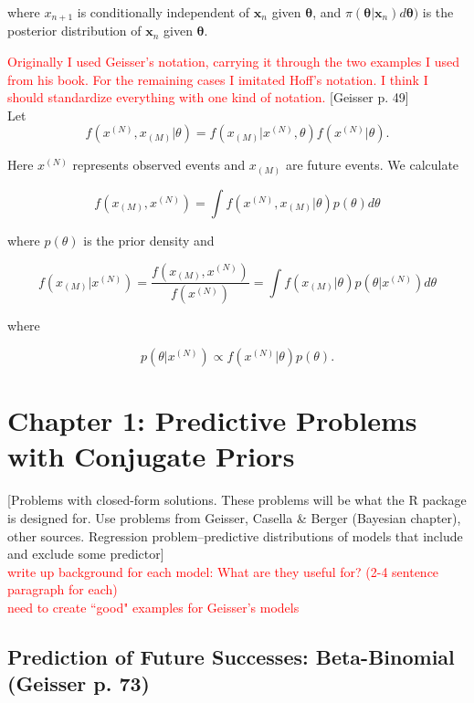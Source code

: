 \documentclass[12pt, a4paper]{article}
\begin{document}
\noindent where $x_{n+1}$ is conditionally independent of $\mathbf{x}_n$ given $\boldsymbol\theta$, and $\pi(\boldsymbol\theta | \mathbf{x}_n)d\boldsymbol\theta)$ is the posterior distribution of $\mathbf{x}_n$ given $\boldsymbol\theta$.

\textcolor{red}{Originally I used Geisser's notation, carrying it through the two examples I used from his book.  For the remaining cases I imitated Hoff's notation.  I think I should standardize everything with one kind of notation.}
    [Geisser p. 49]\\

        Let $$f\left(x^{(N)},x_{(M)}|\theta\right) = f\left(x_{(M)}|x^{(N)},\theta\right)f\left(x^{(N)}|\theta\right).$$

    Here $x^{(N)}$ represents observed events and $x_{(M)}$ are future events.  We calculate

    $$f\left(x_{(M)},x^{(N)}\right) = \int f\left(x^{(N)},x_{(M)}|\theta\right)p(\theta)d\theta$$

    where $p(\theta)$ is the prior density and

    $$f\left(x_{(M)}|x^{(N)}\right) = \frac{f\left(x_{(M)},x^{(N)}\right)}{f\left(x^{(N)}\right)} = \int f\left(x_{(M)}|\theta\right)p\left(\theta|x^{(N)}\right)d\theta$$

    where

    $$p\left(\theta|x^{(N)}\right) \propto f\left(x^{(N)}|\theta\right)p(\theta).$$




\clearpage

\section{Chapter 1:  Predictive Problems with Conjugate Priors}

  [Problems with closed-form solutions.  These problems will be what the R package is designed for.  Use problems from Geisser, Casella \& Berger (Bayesian chapter), other sources.  Regression problem--predictive distributions of models that include and exclude some predictor]\\

  \textcolor{red}{write up background for each model:  What are they useful for? (2-4 sentence paragraph for each)}\\
  \textcolor{red}{ need to create ``good" examples for Geisser's models}

  \subsection{Prediction of Future Successes:  Beta-Binomial (Geisser p. 73)}
\end{document}
